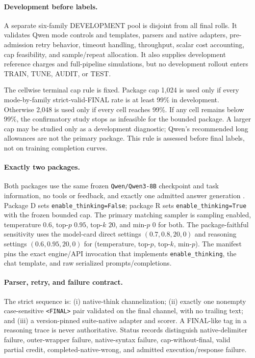 \documentclass{article}
\newcommand{\D}{\ensuremath{\mathrm{D}}}
\newcommand{\Rpol}{\ensuremath{\mathrm{R}}}
\newcommand{\1}{\mathbb{I}}
\begin{document}
\paragraph{Development before labels.}
A separate six-family DEVELOPMENT pool is disjoint from all final rolls. It validates Qwen mode controls and templates, parsers and native adapters, pre-admission retry behavior, timeout handling, throughput, scalar cost accounting, cap feasibility, and sample/repeat allocation. It also supplies development reference charges and full-pipeline simulations, but no development rollout enters TRAIN, TUNE, AUDIT, or TEST.

The cellwise terminal cap rule is fixed. Package cap 1,024 is used only if every mode-by-family strict-valid-FINAL rate is at least 99\% in development. Otherwise 2,048 is used only if every cell reaches 99\%. If any cell remains below 99\%, the confirmatory study stops as infeasible for the bounded package. A larger cap may be studied only as a development diagnostic; Qwen's recommended long allowances are not the primary package. This rule is assessed before final labels, not on training completion curves.

\paragraph{Exactly two packages.}
Both packages use the same frozen \texttt{Qwen/Qwen3-8B} checkpoint and task information, no tools or feedback, and exactly one admitted answer generation \citep{yang2025qwen3,qwen3modelcard2026}. Package \D{} sets \texttt{enable\_thinking=False}; package \Rpol{} sets \texttt{enable\_thinking=True} with the frozen bounded cap. The primary matching sampler is sampling enabled, temperature $0.6$, top-$p$ $0.95$, top-$k$ $20$, and min-$p$ $0$ for both. The package-faithful sensitivity uses the model-card direct settings $(0.7,0.8,20,0)$ and reasoning settings $(0.6,0.95,20,0)$ for (temperature, top-$p$, top-$k$, min-$p$). The manifest pins the exact engine/API invocation that implements \texttt{enable\_thinking}, the chat template, and raw serialized prompts/completions.

\paragraph{Parser, retry, and failure contract.}
The strict sequence is: (i) native-think channelization; (ii) exactly one nonempty case-sensitive \texttt{<FINAL>} pair validated on the final channel, with no trailing text; and (iii) a version-pinned suite-native adapter and scorer. A FINAL-like tag in a reasoning trace is never authoritative. Status records distinguish native-delimiter failure, outer-wrapper failure, native-syntax failure, cap-without-final, valid partial credit, completed-native-wrong, and admitted execution/response failure.
\end{document}
